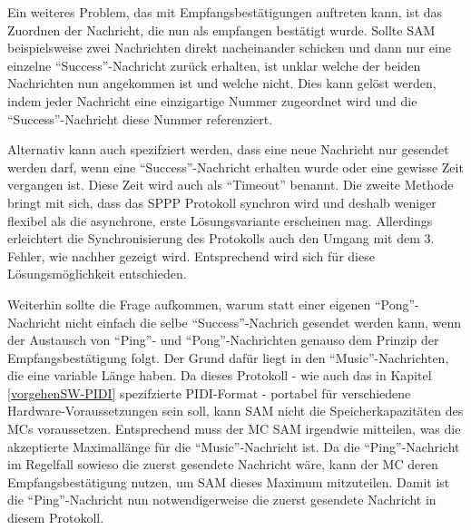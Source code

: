 Ein weiteres Problem, das mit Empfangsbestätigungen auftreten kann, ist das Zuordnen der Nachricht, die nun als empfangen bestätigt wurde.
Sollte \ac{SAM} beispielsweise zwei Nachrichten direkt nacheinander schicken und dann nur eine einzelne \enquote{Success}-Nachricht zurück erhalten, ist unklar welche der beiden Nachrichten nun angekommen ist und welche nicht.
Dies kann gelöst werden, indem jeder Nachricht eine einzigartige Nummer zugeordnet wird und die \enquote{Success}-Nachricht diese Nummer referenziert.

Alternativ kann auch spezifziert werden, dass eine neue Nachricht nur gesendet werden darf, wenn eine \enquote{Success}-Nachricht erhalten wurde oder eine gewisse Zeit vergangen ist.
Diese Zeit wird auch als \enquote{Timeout} benannt.
Die zweite Methode bringt mit sich, dass das \ac{SPPP} Protokoll synchron wird und deshalb weniger flexibel als die asynchrone, erste Lösungsvariante erscheinen mag.
Allerdings erleichtert die Synchronisierung des Protokolls auch den Umgang mit dem 3. Fehler, wie nachher gezeigt wird.
Entsprechend wird sich für diese Lösungsmöglichkeit entschieden.

Weiterhin sollte die Frage aufkommen, warum statt einer eigenen \enquote{Pong}-Nachricht nicht einfach die selbe \enquote{Success}-Nachrich gesendet werden kann, wenn der Austausch von \enquote{Ping}- und \enquote{Pong}-Nachrichten genauso dem Prinzip der Empfangsbestätigung folgt.
Der Grund dafür liegt in den \enquote{Music}-Nachrichten, die eine variable Länge haben.
Da dieses Protokoll - wie auch das in Kapitel \ref{vorgehenSW-PIDI} spezifzierte \ac{PIDI}-Format - portabel für verschiedene Hardware-Voraussetzungen sein soll, kann \ac{SAM} nicht die Speicherkapazitäten des \ac{MC}s voraussetzen.
Entsprechend muss der \ac{MC} \ac{SAM} irgendwie mitteilen, was die akzeptierte Maximallänge für die \enquote{Music}-Nachricht ist.
Da die \enquote{Ping}-Nachricht im Regelfall sowieso die zuerst gesendete Nachricht wäre, kann der \ac{MC} deren Empfangsbestätigung nutzen, um \ac{SAM} dieses Maximum mitzuteilen.
Damit ist die \enquote{Ping}-Nachricht nun notwendigerweise die zuerst gesendete Nachricht in diesem Protokoll.

